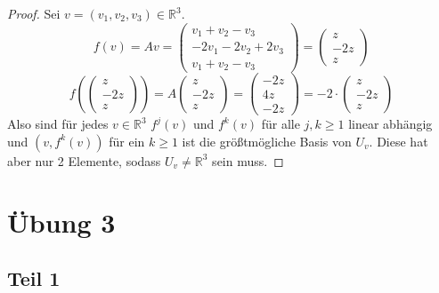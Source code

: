 \documentclass[10pt,a4paper]{article}
\begin{document}
\begin{proof}
Sei $v = (v_{1}, v_{2}, v_{3}) \in \mathbb{R}^{3}$.
\begin{equation}
f(v) = Av = \begin{pmatrix}
v_{1} + v_{2} - v_{3}\\
-2v_{1} - 2v_{2} + 2v_{3}\\
v_{1} + v_{2} - v_{3}
\end{pmatrix}
= \begin{pmatrix}
z\\-2z\\z
\end{pmatrix}
\end{equation}
\begin{equation}
f(\begin{pmatrix}
z\\-2z\\z
\end{pmatrix}) = A\begin{pmatrix}
z\\-2z\\z
\end{pmatrix}
= \begin{pmatrix}
-2z\\4z\\-2z
\end{pmatrix}
= -2 \cdot \begin{pmatrix}
z\\-2z\\z
\end{pmatrix}
\end{equation}
Also sind für jedes $v \in \mathbb{R}^{3}$ $f^{j}(v)$ und $f^{k}(v)$ für alle $j, k \ge 1$ linear abhängig und $(v, f^{k}(v))$ für ein $k \ge 1$ ist die größtmögliche Basis von $U_{v}$.
Diese hat aber nur 2 Elemente, sodass $U_{v} \ne \mathbb{R}^{3}$ sein muss.
\end{proof}

\section*{Übung 3}

\subsection*{Teil 1}
\end{document}
